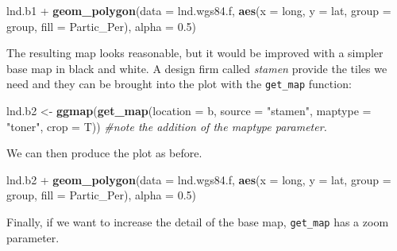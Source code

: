 \documentclass[]{article}
\newenvironment{Shaded}{}{}
\newcommand{\KeywordTok}[1]{\textcolor[rgb]{0.00,0.44,0.13}{\textbf{{#1}}}}
\newcommand{\DataTypeTok}[1]{\textcolor[rgb]{0.56,0.13,0.00}{{#1}}}
\newcommand{\FloatTok}[1]{\textcolor[rgb]{0.25,0.63,0.44}{{#1}}}
\newcommand{\StringTok}[1]{\textcolor[rgb]{0.25,0.44,0.63}{{#1}}}
\newcommand{\CommentTok}[1]{\textcolor[rgb]{0.38,0.63,0.69}{\textit{{#1}}}}
\newcommand{\NormalTok}[1]{{#1}}
\begin{document}
\begin{Shaded}
\begin{Highlighting}[]
\NormalTok{lnd.b1 + }\KeywordTok{geom_polygon}\NormalTok{(}\DataTypeTok{data =} \NormalTok{lnd.wgs84.f, }\KeywordTok{aes}\NormalTok{(}\DataTypeTok{x =} \NormalTok{long, }\DataTypeTok{y =} \NormalTok{lat, }\DataTypeTok{group =} \NormalTok{group, }
    \DataTypeTok{fill =} \NormalTok{Partic_Per), }\DataTypeTok{alpha =} \FloatTok{0.5}\NormalTok{)}
\end{Highlighting}
\end{Shaded}
The resulting map looks reasonable, but it would be improved with a
simpler base map in black and white. A design firm called \emph{stamen}
provide the tiles we need and they can be brought into the plot with the
\texttt{get\_map} function:

\begin{Shaded}
\begin{Highlighting}[]
\NormalTok{lnd.b2 <- }\KeywordTok{ggmap}\NormalTok{(}\KeywordTok{get_map}\NormalTok{(}\DataTypeTok{location =} \NormalTok{b, }\DataTypeTok{source =} \StringTok{"stamen"}\NormalTok{, }\DataTypeTok{maptype =} \StringTok{"toner"}\NormalTok{, }
    \DataTypeTok{crop =} \NormalTok{T))  }\CommentTok{#note the addition of the maptype parameter.}
\end{Highlighting}
\end{Shaded}
We can then produce the plot as before.

\begin{Shaded}
\begin{Highlighting}[]
\NormalTok{lnd.b2 + }\KeywordTok{geom_polygon}\NormalTok{(}\DataTypeTok{data =} \NormalTok{lnd.wgs84.f, }\KeywordTok{aes}\NormalTok{(}\DataTypeTok{x =} \NormalTok{long, }\DataTypeTok{y =} \NormalTok{lat, }\DataTypeTok{group =} \NormalTok{group, }
    \DataTypeTok{fill =} \NormalTok{Partic_Per), }\DataTypeTok{alpha =} \FloatTok{0.5}\NormalTok{)}
\end{Highlighting}
\end{Shaded}
Finally, if we want to increase the detail of the base map,
\texttt{get\_map} has a zoom parameter.
\end{document}
